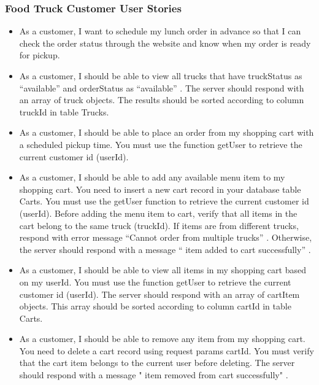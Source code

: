 \documentclass[12pt,a4paper]{article}
\begin{document}
\subsubsection{Food Truck Customer User Stories}
\begin{storybox}
\begin{itemize}[leftmargin=1em, itemsep=6pt]
    \item As a customer, I want to schedule my lunch order in advance so that I can check the order status through the website and know when my order is ready for pickup.
    \item As a customer, I should be able to view all trucks that have truckStatus as “available” and orderStatus as “available” . The server should respond with an array of truck objects. The results should be sorted according to column truckId in table Trucks.
    \item As a customer, I should be able to place an order from my shopping cart with a scheduled pickup time. You must use the function getUser to retrieve the current customer id (userId).
    \item As a customer, I should be able to add any available menu item to my shopping cart. You need to insert a new cart record in your database table Carts. You must use the getUser function to retrieve the current customer id (userId). Before adding the menu item to cart, verify that all items in the cart belong to the same truck (truckId). If items are from different trucks, respond with error message “Cannot order from multiple trucks” . Otherwise, the server should respond with a message “ item added to cart successfully” .
    \item As a customer, I should be able to view all items in my shopping cart based on my userId. You must use the function getUser to retrieve the current customer id (userId). The server should respond with an array of cartItem objects. This array should be sorted according to column cartId in table Carts.
    \item As a customer, I should be able to remove any item from my shopping cart. You need to delete a cart record using request params cartId. You must verify that the cart item belongs to the current user before deleting. The server should respond with a message " item removed from cart successfully" .
\end{itemize}
\end{storybox}

\newpage
\end{document}
